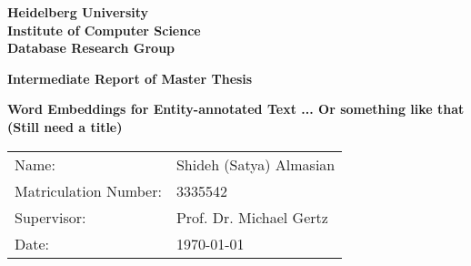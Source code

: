 \begin{titlepage}
  
\vspace*{1cm}
\begin{center}
\vspace*{3cm}
\textbf{ 
\Large Heidelberg University\\
\smallskip
\Large Institute of Computer Science \\
\smallskip
\Large Database Research Group\\
\smallskip
}

\vspace{3cm}

\textbf{\large Intermediate Report of Master Thesis } %

\vspace{0.5\baselineskip}
{\huge
\textbf{Word Embeddings for Entity-annotated Text ... Or something like that (Still need a title) }
}
\end{center}

\vfill 

{\large
\begin{tabular}[l]{ll}
Name: & Shideh (Satya) Almasian \\
Matriculation Number: & 3335542\\
Supervisor: & Prof. Dr. Michael Gertz\\
Date: & \today
\end{tabular}
}

\end{titlepage}

\newpage
\null
\thispagestyle{empty}
\newpage
